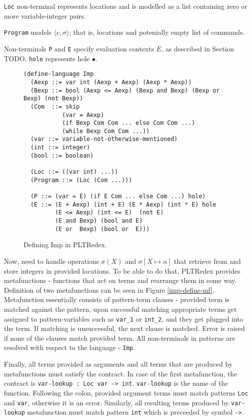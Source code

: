 \texttt{Loc} non-terminal represents locations and is modelled as a list containing zero or more variable-integer pairs.

\texttt{Program} models $\langle c, \sigma \rangle$; that is, locations and potenially empty list of commands.

Non-terminals \texttt{P} and \texttt{E} specify evaluation contexts $E$, as described in Section TODO. \texttt{hole} represents hole $\bullet$.

\begin{figure}[h]
\begin{verbatim}
(define-language Imp
  (Aexp ::= var int (Aexp + Aexp) (Aexp * Aexp))
  (Bexp ::= bool (Aexp <= Aexp) (Bexp and Bexp) (Bexp or Bexp) (not Bexp))
  (Com  ::= skip
           (var = Aexp)
           (if Bexp Com Com ... else Com Com ...)
           (while Bexp Com Com ...))
  (var ::= variable-not-otherwise-mentioned)
  (int ::= integer)
  (bool ::= boolean) 

  (Loc ::= ((var int) ...))
  (Program ::= (Loc (Com ...)))

  (P ::= (var = E) (if E Com ... else Com ...) hole)
  (E ::= (E + Aexp) (int + E) (E * Aexp) (int * E) hole 
         (E <= Aexp) (int <= E)  (not E)     
         (E and Bexp) (bool and E)
         (E or  Bexp) (bool or  E)))
\end{verbatim}
\caption{Defining Imp in PLTRedex.}
\label{imp-define-language}
\end{figure}

Now, need to handle operations $\sigma(X)$ and $\sigma[X \mapsto n]$ that retrieve from and store integers in provided locations. To be able to do that, PLTRedex provides metafunctions - functions that act on terms and rearrange them in some way. Definition of two metafunctions can be seen in Figure \ref{imp-define-mf}. Metafunction essentially consists of pattern-term clauses - provided term is matched against the pattern, upon successful matching appropriate terms get assigned to pattern-variables such as \texttt{var\_1} or \texttt{int\_2}, and they get plugged into the term. If matching is unsuccessful, the next clause is matched. Error is raised if none of the clauses match provided term. All non-terminals in patterns are resolved with respect to the language - \texttt{Imp}.

Finally, all terms provided as arguments and all terms that are produced by metafunctions must satisfy the contract. In case of the first metafunction, the contract is \texttt{var-lookup : Loc var -> int}. \texttt{var-lookup} is the name of the function. Following the colon, provided argument terms must match patterns \texttt{Loc} and \texttt{var}, otherwise it is an error. Similarly, all resulting terms produced by \texttt{var-lookup} metafunction must match pattern \texttt{int} which is preceeded by symbol \texttt{->}.

